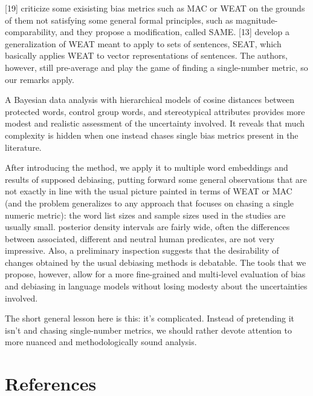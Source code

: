 \documentclass[
  12pt,
  dvipsnames,enabledeprecatedfontcommands]{scrartcl}
\begin{document}
{[}19{]} criticize some exisisting bias metrics such as \textsf{MAC} or
\textsf{WEAT} on the grounds of them not satisfying some general formal
principles, such as magnitude-comparability, and they propose a
modification, called \textsf{SAME}. {[}13{]} develop a generalization of
\textsf{WEAT} meant to apply to sets of sentences, \textsf{SEAT}, which
basically applies \textsf{WEAT} to vector representations of sentences.
The authors, however, still pre-average and play the game of finding a
single-number metric, so our remarks apply.


A Bayesian data analysis with hierarchical models of cosine distances
between protected words, control group words, and stereotypical
attributes provides more modest and realistic assessment of the
uncertainty involved. It reveals that much complexity is hidden when one
instead chases single bias metrics present in the literature.

After introducing the method, we apply it to multiple word embeddings
and results of supposed debiasing, putting forward some general
observations that are not exactly in line with the usual picture painted
in terms of \textsf{WEAT} or \textsf{MAC} (and the problem generalizes
to any approach that focuses on chasing a single numeric metric): the
word list sizes and sample sizes used in the studies are usually small.
posterior density intervals are fairly wide, often the differences
between associated, different and neutral human predicates, are not very
impressive. Also, a preliminary inspection suggests that the
desirability of changes obtained by the usual debiasing methods is
debatable. The tools that we propose, however, allow for a more
fine-grained and multi-level evaluation of bias and debiasing in
language models without losing modesty about the uncertainties involved.

The short general lesson here is this: it's complicated. Instead of
pretending it isn't and chasing single-number metrics, we should rather
devote attention to more nuanced and methodologically sound analysis.

\newpage

\hypertarget{references}{%
\section*{References}\label{references}}
\end{document}
